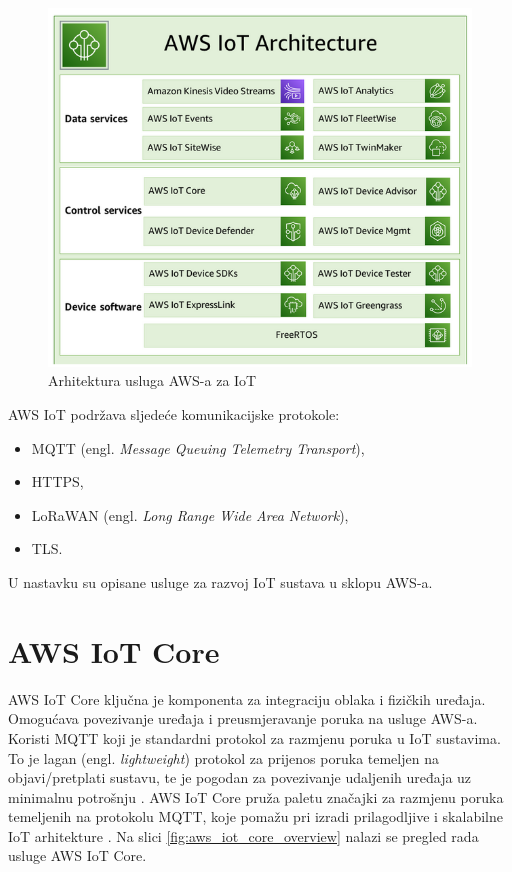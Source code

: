 \begin{figure}[ht]
	\centering
	\includegraphics[scale=0.8]{imgs/aws_iot_arch}
	\caption{Arhitektura usluga AWS-a za IoT \cite{aws_docs}}
	\label{fig:aws_iot_arch}
\end{figure}

AWS IoT podržava sljedeće komunikacijske protokole:
\begin{itemize}
	\item MQTT (engl. \textit{Message Queuing Telemetry Transport}),
	\item HTTPS,
	\item LoRaWAN (engl. \textit{Long Range Wide Area Network}),
	\item TLS.
\end{itemize}

U nastavku su opisane usluge za razvoj IoT sustava u sklopu AWS-a.

\section{AWS IoT Core}

AWS IoT Core ključna je komponenta za integraciju oblaka i fizičkih uređaja. Omogućava povezivanje uređaja i preusmjeravanje poruka na usluge AWS-a. Koristi MQTT koji je standardni protokol za razmjenu poruka u IoT sustavima. To je lagan (engl. \textit{lightweight}) protokol za prijenos poruka temeljen na objavi/pretplati sustavu, te je pogodan za povezivanje udaljenih uređaja uz minimalnu potrošnju \cite{what_is_mqtt}. AWS IoT Core pruža paletu značajki za razmjenu poruka temeljenih na protokolu MQTT, koje pomažu pri izradi prilagodljive i skalabilne IoT arhitekture \cite{aws_docs}. Na slici \ref{fig:aws_iot_core_overview} nalazi se pregled rada usluge AWS IoT Core.

